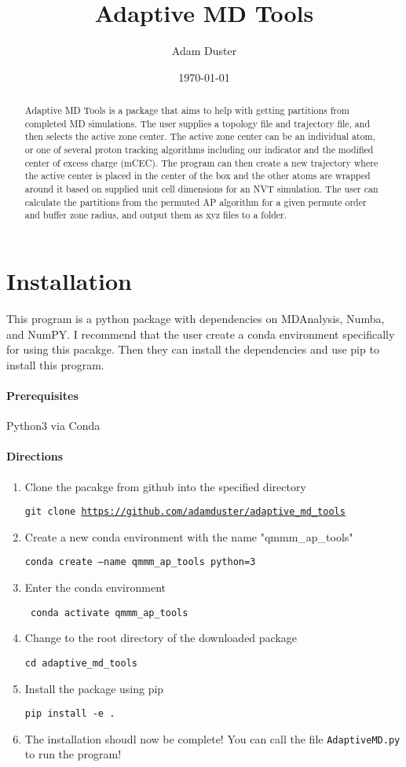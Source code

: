 \documentclass{article}
\title{Adaptive MD Tools}
\author{Adam Duster}
\date{\today}
\begin{document}
\maketitle
\begin{abstract}
Adaptive MD Tools is a package that aims to help with getting partitions from completed MD simulations.
The user supplies a topology file and trajectory file, and then selects the active zone center.
The active zone center can be an individual atom, or one of several proton tracking algorithms including our indicator and the modified center of excess charge (mCEC).
The program can then create a new trajectory where the active center is placed in the center of the box and the other atoms are wrapped around it based on supplied unit cell dimensions for an NVT simulation.
The user can calculate the partitions from the permuted AP algorithm for a given permute order and buffer zone radius, and output them as xyz files to a folder.
\end{abstract}
\section{Installation}
This program is a python package with dependencies on MDAnalysis, Numba, and NumPY. I recommend that the user create a conda environment specifically for using this pacakge. Then they can install the dependencies and use pip to install this program.

\paragraph{Prerequisites}

Python3 via Conda

\paragraph{Directions}
\begin{enumerate}
\item Clone the pacakge from github into the specified directory

\texttt{git clone \url{https://github.com/adamduster/adaptive_md_tools}}

\item Create a new conda environment with the name "qmmm\_ap\_tools"

\texttt{conda create --name qmmm\_ap\_tools python=3}

\item Enter the conda environment

\texttt{ conda activate qmmm\_ap\_tools }

\item Change to the root directory of the downloaded package

\texttt{cd adaptive\_md\_tools}

\item Install the package using pip

\texttt{pip install -e .}

\item The installation shoudl now be complete!
You can call the file \texttt{AdaptiveMD.py} to run the program!
\end{enumerate}
\end{document}
